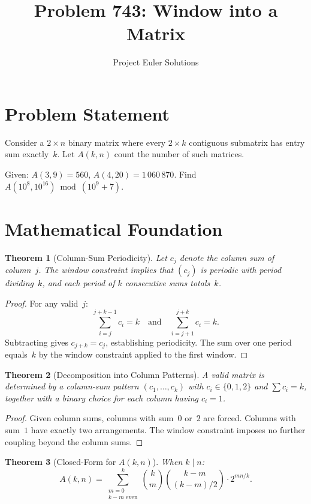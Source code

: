 \documentclass[11pt]{article}
\title{Problem 743: Window into a Matrix}
\author{Project Euler Solutions}
\date{}
\newtheorem{theorem}{Theorem}
\theoremstyle{definition}
\begin{document}
\maketitle

\section{Problem Statement}

Consider a $2 \times n$ binary matrix where every $2 \times k$ contiguous submatrix has entry sum exactly~$k$. Let $A(k,n)$ count the number of such matrices.

Given: $A(3,9) = 560$, $A(4,20) = 1\,060\,870$. Find $A(10^8, 10^{16}) \bmod (10^9+7)$.

\section{Mathematical Foundation}

\begin{theorem}[Column-Sum Periodicity]
Let $c_j$ denote the column sum of column~$j$. The window constraint implies that $(c_j)$ is periodic with period dividing~$k$, and each period of $k$ consecutive sums totals~$k$.
\end{theorem}

\begin{proof}
For any valid~$j$:
\[
\sum_{i=j}^{j+k-1} c_i = k \quad\text{and}\quad \sum_{i=j+1}^{j+k} c_i = k.
\]
Subtracting gives $c_{j+k} = c_j$, establishing periodicity. The sum over one period equals~$k$ by the window constraint applied to the first window.
\end{proof}

\begin{theorem}[Decomposition into Column Patterns]
A valid matrix is determined by a column-sum pattern $(c_1,\ldots,c_k)$ with $c_i \in \{0,1,2\}$ and $\sum c_i = k$, together with a binary choice for each column having $c_i = 1$.
\end{theorem}

\begin{proof}
Given column sums, columns with sum~$0$ or~$2$ are forced. Columns with sum~$1$ have exactly two arrangements. The window constraint imposes no further coupling beyond the column sums.
\end{proof}

\begin{theorem}[Closed-Form for $A(k,n)$]
When $k \mid n$:
\[
A(k,n) = \sum_{\substack{m=0 \\ k-m \text{ even}}}^{k} \binom{k}{m}\binom{k-m}{(k-m)/2} \cdot 2^{mn/k}.
\]
\end{theorem}
\end{document}
